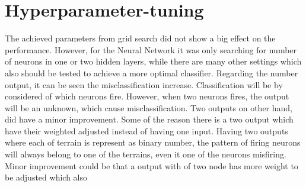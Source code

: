 \documentclass[USenglish]{ifimaster}  %
\begin{document}
\section{Hyperparameter-tuning}
The achieved parameters from grid search did not show a big effect on the performance. However, for the Neural Network it was only searching for number of neurons in one or two hidden layers, while there are many other settings which also should be tested to achieve a more optimal classifier. Regarding the number output, it can be seen the misclassification increase. Classification will be by considered of which neurons fire. However, when two neurons fires, the output will be an unknown, which cause misclassification. Two outputs on other hand, did have a minor improvement. Some of the reason there is a two output which have their weighted adjusted instead of having one input. Having two outputs where each of terrain is represent as binary number, the pattern of firing neurons will always belong to one of the terrains, even it one of the neurons misfiring. Minor improvement could be that a output with of two node has more weight to be adjusted which also 
\end{document}
